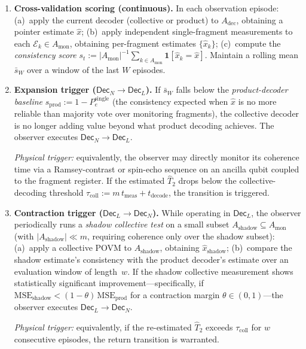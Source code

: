 \documentclass[11pt]{article}
\newcommand{\cE}{\mathcal{E}}
\newcommand{\1}{\mathbf{1}}
\theoremstyle{definition}
\theoremstyle{plain}
\begin{document}
\begin{enumerate}[leftmargin=2em,label=\textbf{L2.\arabic*}]
\item \textbf{Cross-validation scoring (continuous).}
  In each observation episode:
  (a)~apply the current decoder (collective or product) to
  $A_{\mathrm{dec}}$, obtaining a pointer estimate $\widehat{x}$;
  (b)~apply independent single-fragment measurements to each
  $\cE_k\in A_{\mathrm{mon}}$, obtaining per-fragment estimates
  $\{\widehat{x}_k\}$;
  (c)~compute the \emph{consistency score}
  $s_t := |A_{\mathrm{mon}}|^{-1}\sum_{k\in A_{\mathrm{mon}}}
  \mathbf{1}[\widehat{x}_k = \widehat{x}]$.
  Maintain a rolling mean $\bar{s}_W$ over a window of the last $W$
  episodes.

\item \textbf{Expansion trigger
  ($\mathsf{Dec}_N\to\mathsf{Dec}_L$).}
  If $\bar{s}_W$ falls below the \emph{product-decoder baseline}
  $s_{\mathrm{prod}} := 1-P_e^{\mathrm{single}}$ (the consistency
  expected when $\widehat{x}$ is no more reliable than majority vote
  over monitoring fragments), the collective decoder is no longer adding
  value beyond what product decoding achieves.
  The observer executes
  $\mathsf{Dec}_N\to\mathsf{Dec}_L$.

  \emph{Physical trigger:} equivalently, the observer may directly
  monitor its coherence time via a Ramsey-contrast or spin-echo sequence
  on an ancilla qubit coupled to the fragment register.
  If the estimated $\widehat{T}_2$ drops below the collective-decoding
  threshold $\tau_{\mathrm{coll}}:= m\,t_{\mathrm{meas}}+t_{\mathrm{decode}}$,
  the transition is triggered.

\item \textbf{Contraction trigger
  ($\mathsf{Dec}_L\to\mathsf{Dec}_N$).}
  While operating in $\mathsf{Dec}_L$, the observer periodically runs a
  \emph{shadow collective test} on a small subset
  $A_{\mathrm{shadow}}\subseteq A_{\mathrm{mon}}$
  (with $|A_{\mathrm{shadow}}|\ll m$, requiring coherence only over the
  shadow subset):
  (a)~apply a collective POVM to $A_{\mathrm{shadow}}$, obtaining
  $\widehat{x}_{\mathrm{shadow}}$;
  (b)~compare the shadow estimate's consistency with the product
  decoder's estimate over an evaluation window of length~$w$.
  If the shadow collective measurement shows statistically significant
  improvement---specifically, if
  $\mathrm{MSE}_{\mathrm{shadow}} <
  (1-\theta)\,\mathrm{MSE}_{\mathrm{prod}}$
  for a contraction margin $\theta\in(0,1)$---the observer executes
  $\mathsf{Dec}_L\to\mathsf{Dec}_N$.

  \emph{Physical trigger:} equivalently, if the re-estimated
  $\widehat{T}_2$ exceeds $\tau_{\mathrm{coll}}$ for $w$ consecutive
  episodes, the return transition is warranted.
\end{enumerate}
\end{document}

